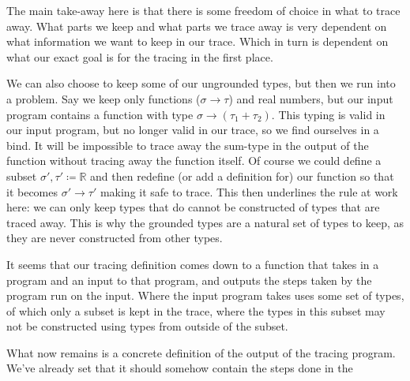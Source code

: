     The main take-away here is that there is some freedom of choice in what to trace away.
    What parts we keep and what parts we trace away is very dependent on what information we want to keep in our trace.
    Which in turn is dependent on what our exact goal is for the tracing in the first place.
    
    We can also choose to keep some of our ungrounded types, but then we run into a problem.
    Say we keep only functions ($\sigma\to\tau$) and real numbers, but our input program contains a function with type $\sigma\to(\tau_1+\tau_2)$.
    This typing is valid in our input program, but no longer valid in our trace, so we find ourselves in a bind.
    It will be impossible to trace away the sum-type in the output of the function without tracing away the function itself.
    Of course we could define a subset $\sigma',\tau'\coloneqq\mathbb{R}$ and then redefine (or add a definition for) our function so that it becomes $\sigma'\to\tau'$ making it safe to trace.
    This then underlines the rule at work here: we can only keep types that do cannot be constructed of types that are traced away.
    This is why the grounded types are a natural set of types to keep, as they are never constructed from other types.

    It seems that our tracing definition comes down to a function that takes in a program and an input to that program, and outputs the steps taken by the program run on the input.
    Where the input program takes uses some set of types, of which only a subset is kept in the trace, where the types in this subset may not be constructed using types from outside of the subset.

    What now remains is a concrete definition of the output of the tracing program.
    We've already set that it should somehow contain the steps done in the 
